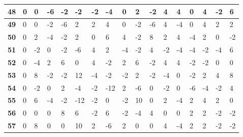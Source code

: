 \begin{longtable}[c]{|l|l|l|l|l|l|l|l|l|l|l|l|l|l|l|l|l|}
\textbf{48} & 0          & 0          & -6         & -2         & -2         & -2         & -4         & 0          & 2          & -2         & 4           & 4           & 0           & 4           & -2          & 6           \\ \hline
\textbf{49} & 0          & 0          & -2         & -6         & 2          & 2          & 4          & 0          & -2         & -6         & 4           & -4          & 0           & 4           & 2           & 2           \\ \hline
\textbf{50} & 0          & 2          & -4         & -2         & 2          & 0          & 6          & 4          & -2         & 8          & 2           & 4           & -4          & 2           & 0           & -2          \\ \hline
\textbf{51} & 0          & -2         & 0          & -2         & -6         & 4          & 2          & -4         & -2         & 4          & -2          & -4          & -4          & -2          & -4          & 6           \\ \hline
\textbf{52} & 0          & -4         & 2          & 6          & 0          & 4          & -2         & 2          & 6          & -2         & 4           & 4           & -2          & -2          & 0           & 0           \\ \hline
\textbf{53} & 0          & 8          & -2         & -2         & 12         & -4         & -2         & -2         & 2          & -2         & -4          & 0           & -2          & 2           & 4           & 8           \\ \hline
\textbf{54} & 0          & -2         & 0          & 2          & -4         & -2         & -12        & 2          & -6         & 0          & -2          & 0           & -6          & -4          & -2          & 4           \\ \hline
\textbf{55} & 0          & 6          & -4         & -2         & -12        & -2         & 0          & -2         & 10         & 0          & 2           & -4          & 2           & 4           & 2           & 0           \\ \hline
\textbf{56} & 0          & 0          & 0          & 8          & 6          & -2         & 6          & -2         & -4         & 4          & 0           & 0           & 2           & 2           & -2          & -2          \\ \hline
\textbf{57} & 0          & 8          & 0          & 0          & 10         & 2          & -6         & 2          & 0          & 0          & 4           & -4          & 2           & 2           & -2          & -2          \\ \hline

\end{longtable}
